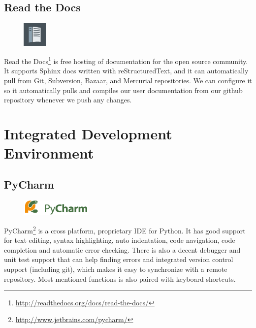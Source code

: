 \subsection{Read the Docs}
\begin{figure}
	\vspace{-20pt}
	\includegraphics[width=1.2cm]{./planning/img/readthedocs_logo}
	\vspace{-20pt}
\end{figure}
Read the Docs\footnote{\url{http://readthedocs.org/docs/read-the-docs/}} is
free hosting of documentation for the open source community. It supports Sphinx
docs written with reStructuredText, and it can automatically pull from Git,
Subversion, Bazaar, and Mercurial repositories. We can configure it so it
automatically pulls and compiles our user documentation from our github
repository whenever we push any changes.


\section{Integrated Development Environment}
\label{sec:pre:ide}

\subsection{PyCharm}
\begin{figure}
	\vspace{-20pt}
	\includegraphics[width=3.5cm]{./planning/img/pycharm_logo}
	\vspace{-20pt}
\end{figure}
PyCharm\footnote{\url{http://www.jetbrains.com/pycharm/}}
is a cross platform, proprietary IDE for Python. It has good support
for text editing, syntax highlighting, auto indentation, code navigation, code
completion and automatic error checking. There is also a decent debugger and
unit test support that can help finding errors and integrated version control
support (including git), which makes it easy to synchronize with a remote
repository. Most mentioned functions is also paired with keyboard shortcuts.

